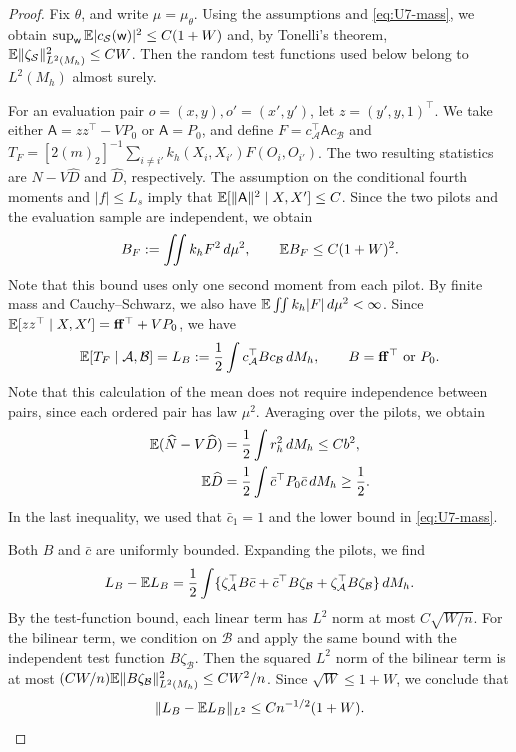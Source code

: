 \begin{proof}
Fix $\theta$, and write $\mu=\mu_\theta$. Using the assumptions and
\eqref{eq:U7-mass}, we obtain
$\sup_{\mathsf w}\mathbb E|c_{\mathcal S}(\mathsf w)|^2\le C(1+W)$ and,
by Tonelli's theorem, $\mathbb E\|\zeta_{\mathcal S}\|_{L^2(M_h)}^2\le CW$.
Then the random test functions used below belong to $L^2(M_h)$ almost
surely.

For an evaluation pair $o=(x,y),o'=(x',y')$, let $z=(y',y,1)^\top$.
We take either $\mathsf A=zz^\top-VP_0$ or $\mathsf A=P_0$, and define
$F=c_{\mathcal A}^\top\mathsf A c_{\mathcal B}$ and
$T_F=[2(m)_2]^{-1}\sum_{i\ne i'}k_h(X_i,X_{i'})F(O_i,O_{i'})$.
The two resulting statistics are $\widehat N-V\widehat D$ and
$\widehat D$, respectively. The assumption on the conditional fourth
moments and $|f|\le L_s$ imply that $\mathbb E[\|\mathsf A\|^2\mid X,X']\le C$.
Since the two pilots and the evaluation sample are independent, we
obtain
\begin{equation}\label{eq:U8-G2}
 B_F:=\iint k_hF^2\,d\mu^2,\qquad \mathbb E B_F\le C(1+W)^2.
\end{equation}
Note that this bound uses only one second moment from each pilot.
By finite mass and Cauchy--Schwarz, we also have
$\mathbb E\iint k_h|F|\,d\mu^2<\infty$. Since
$\mathbb E[zz^\top\mid X,X']=\mathbf f\mathbf f^\top+VP_0$, we have
\begin{equation}\label{eq:U8-cond}
 \mathbb E[T_F\mid\mathcal A,\mathcal B]
 =L_B:=\frac12\int c_{\mathcal A}^\top Bc_{\mathcal B}\,dM_h,
 \qquad B=\mathbf f\mathbf f^\top\ \text{or}\ P_0.
\end{equation}
Note that this calculation of the mean does not require independence
between pairs, since each ordered pair has law $\mu^2$. Averaging over the
pilots, we obtain
\begin{align}
 \mathbb E(\widehat N-V\widehat D)
 &=\frac12\int r_h^2\,dM_h\le Cb^2,\label{eq:U8-bias}\\
 \mathbb E\widehat D
 &=\frac12\int\bar c^\top P_0\bar c\,dM_h\ge\frac12.
 \label{eq:U8-denominator}
\end{align}
In the last inequality, we used that $\bar c_1=1$ and the lower bound
in \eqref{eq:U7-mass}.

Both $B$ and $\bar c$ are uniformly bounded. Expanding the
pilots, we find
\[
 L_B-\mathbb E L_B=\frac12\int
 \{\zeta_{\mathcal A}^\top B\bar c+
   \bar c^\top B\zeta_{\mathcal B}+
   \zeta_{\mathcal A}^\top B\zeta_{\mathcal B}\}\,dM_h.
\]
By the test-function bound, each linear term has $L^2$ norm at most
$C\sqrt{W/n}$. For the bilinear term, we condition on $\mathcal B$ and
apply the same bound with the independent test function
$B\zeta_{\mathcal B}$. Then the squared $L^2$ norm of the bilinear
term is at most
$(CW/n)\mathbb E\|B\zeta_{\mathcal B}\|_{L^2(M_h)}^2\le CW^2/n$.
Since $\sqrt W\le1+W$, we conclude that
\begin{equation}\label{eq:U11-pilot-fluctuation}
 \|L_B-\mathbb E L_B\|_{L^2}\le Cn^{-1/2}(1+W).
\end{equation}


\end{proof}
